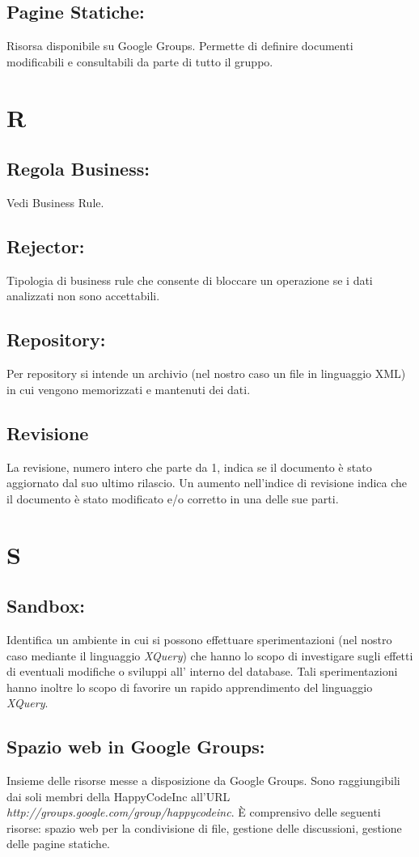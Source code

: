 \section{Pagine Statiche:}
Risorsa disponibile su Google Groups. Permette di definire documenti modificabili e consultabili da parte di tutto il gruppo.

\chapter{R}
\section{Regola Business:}
Vedi Business Rule.
\section{Rejector:}
Tipologia di business rule che consente di bloccare un operazione se i dati analizzati non sono accettabili.
\section{Repository:} 
Per repository si intende un archivio (nel nostro caso un file in linguaggio XML) in cui vengono memorizzati e mantenuti dei dati.
\section{Revisione}
La revisione, numero intero che parte da 1, indica se il documento \`e stato aggiornato dal suo ultimo rilascio. Un aumento nell'indice di revisione indica che il documento \`e stato modificato e/o corretto in una delle sue parti.

\chapter{S}
\section{Sandbox:}
Identifica un ambiente in cui si possono effettuare sperimentazioni (nel nostro caso mediante il linguaggio \textit{XQuery}) che hanno lo scopo di investigare sugli effetti di eventuali modifiche o sviluppi all' interno del database. Tali sperimentazioni hanno inoltre lo scopo di favorire un rapido apprendimento del linguaggio \textit{XQuery}.
\section{Spazio web in Google Groups:}
Insieme delle risorse messe a disposizione da Google Groups. Sono raggiungibili dai soli membri della HappyCodeInc all'URL\\ \textit{http://groups.google.com/group/happycodeinc}. \`E comprensivo delle seguenti risorse: spazio web per la condivisione di file, gestione delle discussioni, gestione delle pagine statiche.
